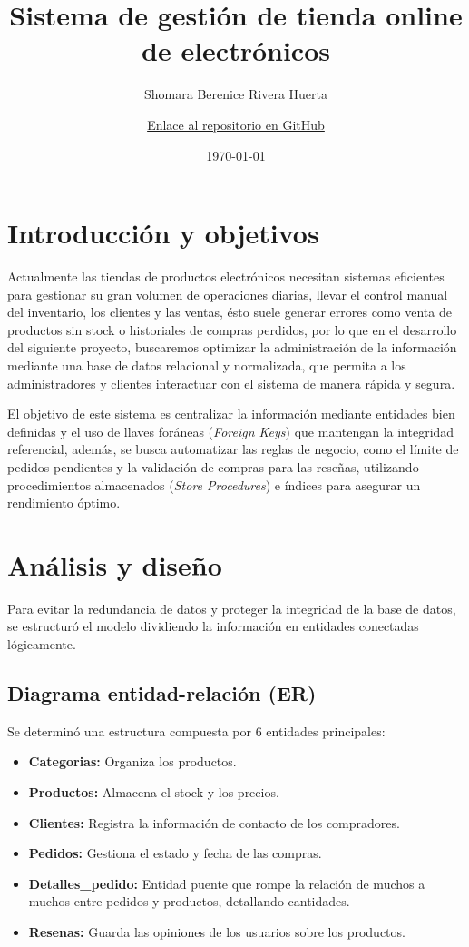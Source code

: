 \documentclass[10pt,letterpaper]{article}
\title{Sistema de gestión de tienda online de electrónicos}
\author{Shomara Berenice Rivera Huerta \and \href{https://github.com/Shomarar01/ProyectoFinal_BD_Tienda}{Enlace al repositorio en GitHub}}
\date{\today}
\begin{document}
\maketitle
\tableofcontents
\lstlistoflistings

\newpage

\section{Introducción y objetivos}
Actualmente las tiendas de productos electrónicos necesitan sistemas eficientes para gestionar su gran volumen de operaciones diarias, llevar el control manual del inventario, los clientes y las ventas, ésto suele generar errores como venta de productos sin stock o historiales de compras perdidos, por lo que en el desarrollo del siguiente proyecto, buscaremos optimizar la administración de la información mediante una base de datos relacional y normalizada, que permita a los administradores y clientes interactuar con el sistema de manera rápida y segura.

El objetivo de este sistema es centralizar la información mediante entidades bien definidas y el uso de llaves foráneas (\textit{Foreign Keys}) que mantengan la integridad referencial, además, se busca automatizar las reglas de negocio, como el límite de pedidos pendientes y la validación de compras para las reseñas, utilizando procedimientos almacenados (\textit{Store Procedures}) e índices para asegurar un rendimiento óptimo.

\section{Análisis y diseño}
Para evitar la redundancia de datos y proteger la integridad de la base de datos, se estructuró el modelo dividiendo la información en entidades conectadas lógicamente.

\subsection{Diagrama entidad-relación (ER)}
Se determinó una estructura compuesta por 6 entidades principales:
\begin{itemize}
    \item \textbf{Categorias:} Organiza los productos.
    \item \textbf{Productos:} Almacena el stock y los precios.
    \item \textbf{Clientes:} Registra la información de contacto de los compradores.
    \item \textbf{Pedidos:} Gestiona el estado y fecha de las compras.
    \item \textbf{Detalles\_pedido:} Entidad puente que rompe la relación de muchos a muchos entre pedidos y productos, detallando cantidades.
    \item \textbf{Resenas:} Guarda las opiniones de los usuarios sobre los productos.
\end{itemize}
\end{document}
